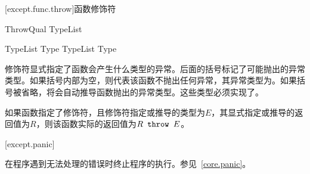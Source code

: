 [except.func.throw]{函数修饰符}

\begin{bnf}{ThrowQual}
     \terminal{(} TypeList\bnfs \terminal{)} \br
\end{bnf}

\begin{bnf}{TypeList}
    Type \br
    TypeList \terminal{,} Type
\end{bnf}

\pnum
{}修饰符显式指定了函数会产生什么类型的异常。后面的括号标记了可能抛出的异常类型。如果括号内部为空，则代表该函数不抛出任何异常，其异常类型为。如果括号被省略，将会自动推导函数抛出的异常类型。这些类型必须实现了。

\pnum
如果函数指定了修饰符，且修饰符指定或推导的类型为$E$，其显式指定或推导的返回值为$R$，则该函数实际的返回值为$R\texttt{ throw }E$。

[except.panic]{}

\pnum
{}在程序遇到无法处理的错误时终止程序的执行。参见~\ref{core.panic}。